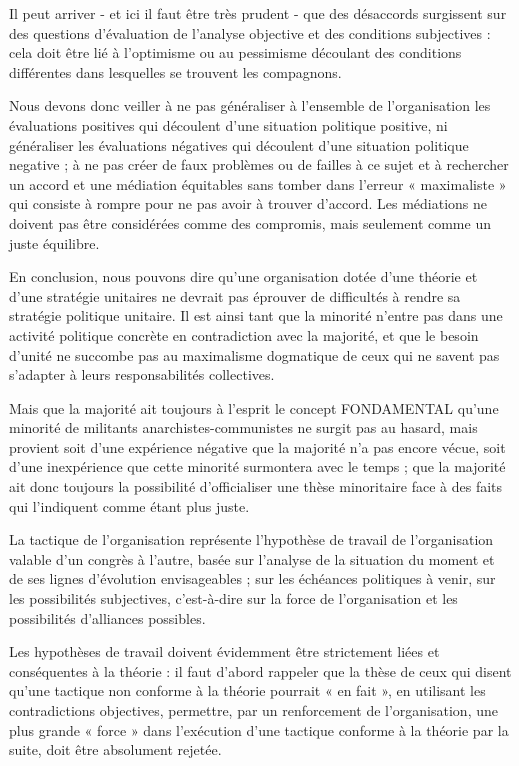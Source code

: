 Il peut arriver - et ici il faut être très prudent - que des désaccords surgissent sur des questions d'évaluation de l'analyse objective et des conditions subjectives : cela doit être lié à l’optimisme ou au pessimisme découlant des conditions différentes dans lesquelles se trouvent les compagnons.

Nous devons donc veiller à ne pas généraliser à l'ensemble de l'organisation les évaluations positives qui découlent d'une situation politique positive, ni généraliser les évaluations négatives qui découlent d'une situation politique negative ; à ne pas créer de faux problèmes ou de failles à ce sujet et à rechercher un accord et une médiation équitables sans tomber dans l'erreur « maximaliste » qui consiste à rompre pour ne pas avoir à trouver d’accord. Les médiations ne doivent pas être considérées comme des compromis, mais seulement comme un juste équilibre.

En conclusion, nous pouvons dire qu'une organisation dotée d'une théorie et d'une stratégie unitaires ne devrait pas éprouver de difficultés à rendre sa stratégie politique unitaire. Il est ainsi tant que la minorité n'entre pas dans une activité politique concrète en contradiction avec la majorité, et que le besoin d'unité ne succombe pas au maximalisme dogmatique de ceux qui ne savent pas s'adapter à leurs responsabilités collectives.

Mais que la majorité ait toujours à l'esprit le concept FONDAMENTAL qu'une minorité de militants anarchistes-communistes ne surgit pas au hasard, mais provient soit d'une expérience négative que la majorité n'a pas encore vécue, soit d'une inexpérience que cette minorité surmontera avec le temps ; que la majorité ait donc toujours la possibilité d'officialiser une thèse minoritaire face à des faits qui l'indiquent comme étant plus juste.

La tactique de l'organisation représente l'hypothèse de travail de l'organisation valable d'un congrès à l'autre, basée sur l'analyse de la situation du moment et de ses lignes d'évolution envisageables ; sur les échéances politiques à venir, sur les possibilités subjectives, c'est-à-dire sur la force de l'organisation et les possibilités d'alliances possibles.

Les hypothèses de travail doivent évidemment être strictement liées et conséquentes à la théorie : il faut d'abord rappeler que la thèse de ceux qui disent qu'une tactique non conforme à la théorie pourrait « en fait », en utilisant les contradictions objectives, permettre, par un renforcement de l'organisation, une plus grande « force » dans l'exécution d'une tactique conforme à la théorie par la suite, doit être absolument rejetée.


